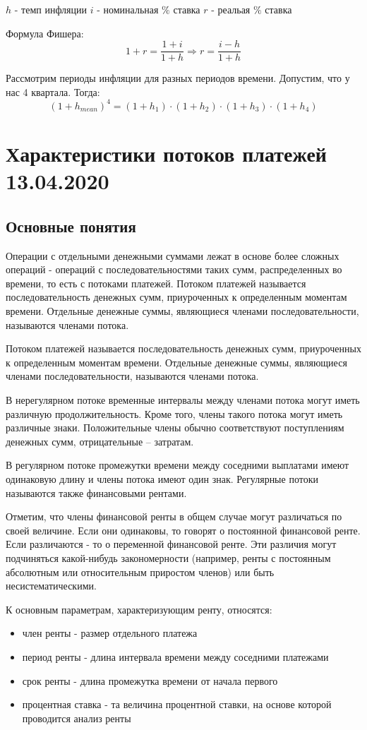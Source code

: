 \documentclass[aps,%
12pt,%
final,%
oneside,
onecolumn,%
musixtex, %
superscriptaddress,%
centertags]{article} %
\begin{document}
$h$ - темп инфляции
$i$ - номинальная $\%$ ставка
$r$ - реальая $\%$ ставка

Формула Фишера:
$$ 1 + r = \frac{1+i}{1+h} \Rightarrow r = \frac{i-h}{1+h}$$

Рассмотрим периоды инфляции для разных периодов времени. Допустим, что у нас 4 квартала. Тогда:
$$ (1+h_{mean})^4 = (1+h_1) \cdot (1+h_2) \cdot (1+h_3) \cdot (1+h_4) $$

\section{Характеристики потоков платежей 13.04.2020}

\subsection{Основные понятия}

Операции с отдельными денежными суммами лежат в основе более сложных операций - операций с последовательностями таких сумм, распределенных во времени, то есть с потоками платежей. Потоком платежей называется последовательность денежных сумм, приуроченных к определенным моментам времени. Отдельные денежные суммы, являющиеся членами последовательности, называются членами потока.

Потоком платежей называется последовательность денежных сумм, приуроченных к определенным моментам времени. Отдельные денежные суммы, являющиеся членами последовательности, называются членами потока.

В нерегулярном потоке временные интервалы между членами потока могут иметь различную продолжительность. Кроме того, члены такого потока могут иметь различные знаки. Положительные члены обычно соответствуют поступлениям денежных сумм, отрицательные – затратам.

В регулярном потоке промежутки времени между соседними выплатами имеют одинаковую длину и члены потока имеют один знак. Регулярные потоки называются также финансовыми рентами.

Отметим, что члены финансовой ренты в общем случае могут различаться по своей величине. Если они одинаковы, то говорят о постоянной финансовой ренте. Если различаются - то о переменной финансовой ренте. Эти различия могут подчиняться какой-нибудь закономерности (например, ренты с постоянным абсолютным или относительным приростом членов) или быть несистематическими.

К основным параметрам, характеризующим ренту, относятся:
\begin{itemize}
	\item член ренты - размер отдельного платежа
	\item период ренты - длина интервала времени между соседними платежами
	\item срок ренты - длина промежутка времени от начала первого 
	\item процентная ставка - та величина процентной ставки, на основе которой проводится анализ ренты
\end{itemize}
\end{document}
